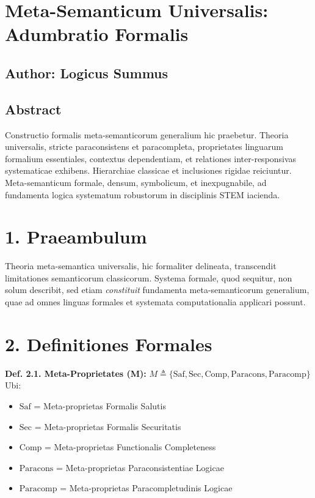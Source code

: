 
\section{Meta-Semanticum Universalis: Adumbratio Formalis}
\label{sec:adumbratio}

\subsection*{Author: Logicus Summus}

\subsection*{Abstract}
Constructio formalis meta-semanticorum generalium hic praebetur. Theoria universalis, stricte paraconsistens et paracompleta, proprietates linguarum formalium essentiales, contextus dependentiam, et relationes inter-responsivas systematicae exhibens. Hierarchiae classicae et inclusiones rigidae reiciuntur. Meta-semanticum formale, densum, symbolicum, et inexpugnabile, ad fundamenta logica systematum robustorum in disciplinis STEM iacienda.

\section*{1. Praeambulum}
Theoria meta-semantica universalis, hic formaliter delineata, transcendit limitationes semanticorum classicorum. Systema formale, quod sequitur, non solum describit, sed etiam \textit{constituit} fundamenta meta-semanticorum generalium, quae ad omnes linguas formales et systemata computationalia applicari possunt.

\section*{2. Definitiones Formales}
\textbf{Def. 2.1. Meta-Proprietates (M):}
$M \triangleq \{ \text{Saf}, \text{Sec}, \text{Comp}, \text{Paracons}, \text{Paracomp} \}$
Ubi:
\begin{itemize}
	\item $\text{Saf}$ = Meta-proprietas Formalis Salutis
	\item $\text{Sec}$ = Meta-proprietas Formalis Securitatis
	\item $\text{Comp}$ = Meta-proprietas Functionalis Completeness
	\item $\text{Paracons}$ = Meta-proprietas Paraconsistentiae Logicae
	\item $\text{Paracomp}$ = Meta-proprietas Paracompletudinis Logicae
\end{itemize}

